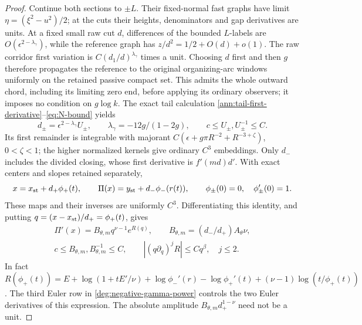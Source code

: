 \begin{proof}
Continue both sections to \(\pm L\). Their fixed-normal fast graphs
have limit \(\eta=(\xi^2-u^2)/2\); at the cuts their heights,
denominators and gap derivatives are units. At a fixed small raw cut
\(d\), differences of the bounded \(L\)-labels are
\(O(\epsilon^{2-\lambda_\gamma})\), while the reference graph has
\(z/d^2=1/2+O(d)+o(1)\). The raw corridor first variation is
\(C(d_1/d)^{\lambda_\gamma}\) times a unit. Choosing \(d\) first
and then \(g\) therefore propagates the reference to the original
organizing-arc windows uniformly on the retained passive compact set.
This admits the whole outward chord, including its limiting zero end,
before applying its ordinary observers; it imposes no condition on
\(g\log k\). The exact tail calculation
\eqref{ann:tail-first-derivative}--\eqref{eq:N-bound} yields
\[
 d_\pm=\epsilon^{2-\lambda_\gamma}U_\pm,\qquad
 \lambda_\gamma=-12g/(1-2g),\qquad
 c\le U_\pm,U_\pm^{-1}\le C.
\]
Its first remainder is integrable with majorant
\(C(\epsilon+g\pi R^{-2}+R^{-3+\zeta})\), \(0<\zeta<1\);
the higher normalized kernels give ordinary \(C^3\) embeddings.
Only \(d_-\) includes the divided closing, whose first derivative is
\(f'(md)d'\). With exact centers and slopes retained separately,
\[
 x=x_{\rm st}+d_+\phi_+(t),\qquad
 \Pi(x)=y_{\rm st}+d_-\phi_-(r(t)),\qquad
 \phi_\pm(0)=0,\quad\phi_\pm'(0)=1.
\]
These maps and their inverses are uniformly \(C^3\). Differentiating
this identity, and putting \(q=(x-x_{\rm st})/d_+=\phi_+(t)\), gives
\begin{equation}\label{deg:negative-gamma-physical-power}
 \begin{gathered}
 \Pi'(x)=B_{\theta,m}q^{\nu-1}e^{R(q)},\qquad B_{\theta,m}=(d_-/d_+)A_\theta\nu,\\
 c\le B_{\theta,m},B_{\theta,m}^{-1}\le C,\qquad
 |(q\partial_q)^jR|\le Cq^\beta,\quad j\le2.
 \end{gathered}
\end{equation}
In fact
\(R(\phi_+(t))=E+\log(1+tE'/\nu)+\log\phi_-'(r)
-\log\phi_+'(t)+(\nu-1)\log(t/\phi_+(t))\).
The third Euler row in \eqref{deg:negative-gamma-power} controls the two
Euler derivatives of this expression. The absolute amplitude
\(B_{\theta,m}d_+^{1-\nu}\) need not be a unit.


\end{proof}
